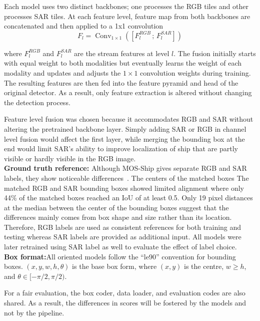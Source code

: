 Each model uses two distinct backbones; one processes the RGB tiles and other processes SAR tiles. At each feature level, feature map from both backbones are concatenated and then applied to a 1x1 convolution\\
\begin{equation}
F_l = \operatorname{Conv}_{1\times1}
\left(
\left[ F_l^{RGB} \,;\, F_l^{SAR} \right]
\right)
\label{eq:rgb_sar_feature_fusion}
\end{equation}

where $F_l^{RGB}$ and $F_l^{SAR}$ are the stream features at level $l$.
The fusion initially starts with equal weight to both modalities but eventually
learns the weight of each modality and updates and adjusts the $1\times1$
convolution weights during training. The resulting features are then fed into
the feature pyramid and head of the original detector. As a result, only
feature extraction is altered without changing the detection process.

Feature level fusion was chosen because it accommodates RGB and SAR without altering the pretrained backbone layer. Simply adding SAR or RGB in channel level fusion would affect the first layer, while merging the bounding box at the end would limit SAR's ability to improve localization of ship that are partly visible or hardly visible in the RGB image.\\

\textbf{Ground truth reference: }Although MOS-Ship gives separate RGB and SAR labels, they show noticeable differences~\cite{you2026multi}. The centers of the matched boxes The matched RGB and SAR bounding boxes showed limited alignment where only 44\% of the matched boxes reached an IoU of at least 0.5. Only 19 pixel distances at the median between the center of the bounding boxes suggest that the differences mainly comes from box shape and size rather than its location. Therefore, RGB labels are used as consistent references for both training and testing whereas SAR labels are provided as additional input. All models were later retrained using SAR label as well to evaluate the effect of label choice.
\\

\textbf{Box format:}All oriented models follow the ``le90'' convention for bounding boxes.
$(x, y, w, h, \theta)$ is the base box form, where $(x, y)$ is the centre,
$w \geq h$, and $\theta \in [-\pi/2, \pi/2)$.

For a fair evaluation, the box coder, data loader, and evaluation codes are
also shared. As a result, the differences in scores will be fostered by the
models and not by the pipeline.\\

